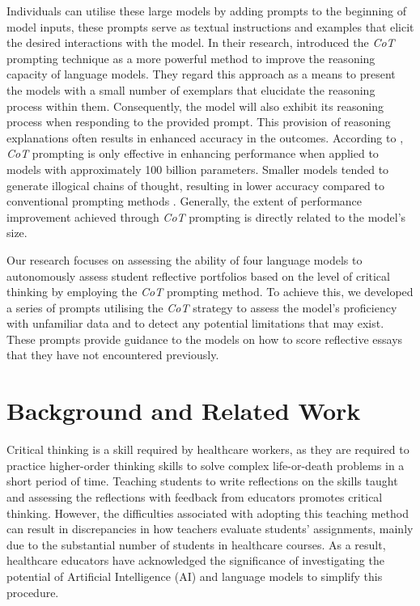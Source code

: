 \documentclass{article}
\begin{document}
Individuals can utilise these large models by adding prompts to the beginning of model inputs, these prompts serve as textual instructions and examples that elicit the desired interactions with the model. In their research, \cite{wei2022chain} introduced the \textit{CoT} prompting technique as a more powerful method to improve the reasoning capacity of language models. They regard this approach as a means to present the models with a small number of exemplars that elucidate the reasoning process within them. Consequently, the model will also exhibit its reasoning process when responding to the provided prompt. This provision of reasoning explanations often results in enhanced accuracy in the outcomes. According to \cite{wei2022chain}, \textit{CoT} prompting is only effective in enhancing performance when applied to models with approximately 100 billion parameters.  Smaller models tended to generate illogical chains of thought, resulting in lower accuracy compared to conventional prompting methods \cite{wei2022chain}. Generally, the extent of performance improvement achieved through \textit{CoT} prompting is directly related to the model's size. 

Our research focuses on assessing the ability of four language models to autonomously assess student reflective portfolios based on the level of critical thinking by employing the \textit{CoT} prompting method. To achieve this, we developed a series of prompts utilising the \textit{CoT} strategy to assess the model’s proficiency with unfamiliar data and to detect any potential limitations that may exist. These prompts provide guidance to the models on how to score reflective essays that they have not encountered previously.

\section{Background and Related Work}

Critical thinking \cite{reynders2020rubrics} is a skill required by healthcare workers, as they are required to practice higher-order thinking skills to solve complex life-or-death problems in a short period of time. Teaching students to write reflections on the skills taught and assessing the reflections with feedback from educators promotes critical thinking\cite{reynders2020rubrics}. 
However, the difficulties associated with adopting this teaching method can result in discrepancies in how teachers evaluate students' assignments, mainly due to the substantial number of students in healthcare courses. As a result, healthcare educators have acknowledged the significance of investigating the potential of Artificial Intelligence (AI) and language models to simplify this procedure.
\end{document}
